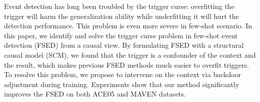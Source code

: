 Event detection has long been troubled by the trigger curse: overfitting the trigger will harm the generalization ability while underfitting it will hurt the detection performance. This problem is even more severe in few-shot scenario. In this paper, we identify and solve the trigger curse problem in few-shot event detection (FSED) from a causal view. By formulating FSED with a structural causal model (SCM), we found that the trigger is a confounder of the context and the result, which makes previous FSED methods much easier to overfit triggers. To resolve this problem, we propose to intervene on the context via backdoor adjustment during training. Experiments show that our method significantly improves the FSED on both ACE05 and MAVEN datasets.
